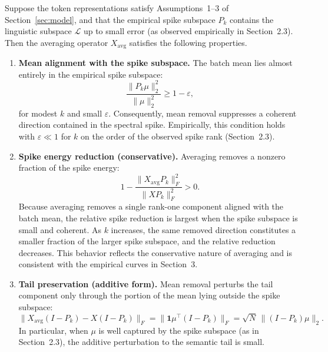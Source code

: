 \begin{theorem}
\label{thm:avg_spectral}
Suppose the token representations satisfy Assumptions~1–3 of
Section~\ref{sec:model}, and that the empirical spike subspace $P_k$ contains the
linguistic subspace $\mathcal L$ up to small error (as observed empirically in
Section~2.3).
Then the averaging operator $X_{\mathrm{avg}}$ satisfies the following properties.

\begin{enumerate}

\item \textbf{Mean alignment with the spike subspace.}
The batch mean lies almost entirely in the empirical spike subspace:
\begin{equation}
\label{eq:mean_spike_align}
\frac{\|P_k \mu\|_2^2}{\|\mu\|_2^2} \ge 1 - \varepsilon,
\end{equation}
for modest $k$ and small $\varepsilon$.
Consequently, mean removal suppresses a coherent direction contained in the
spectral spike.
Empirically, this condition holds with $\varepsilon \ll 1$ for $k$ on the order
of the observed spike rank (Section~2.3).

\item \textbf{Spike energy reduction (conservative).}
Averaging removes a nonzero fraction of the spike energy:
\begin{equation}
\label{eq:spike_reduction}
1 - \frac{\|X_{\mathrm{avg}} P_k\|_F^2}{\|X P_k\|_F^2} > 0.
\end{equation}
Because averaging removes a single rank-one component aligned with the batch
mean, the relative spike reduction is largest when the spike subspace is small
and coherent.
As $k$ increases, the same removed direction constitutes a smaller fraction of
the larger spike subspace, and the relative reduction decreases.
This behavior reflects the conservative nature of averaging and is consistent
with the empirical curves in Section~3.

\item \textbf{Tail preservation (additive form).}
Mean removal perturbs the tail component only through the portion of the mean
lying outside the spike subspace:
\begin{equation}
\label{eq:tail_additive_main}
\|X_{\mathrm{avg}}(I-P_k) - X(I-P_k)\|_F
=
\|\mathbf{1}\mu^\top(I-P_k)\|_F
=
\sqrt{N}\,\|(I-P_k)\mu\|_2.
\end{equation}
In particular, when $\mu$ is well captured by the spike subspace (as in
Section~2.3), the additive perturbation to the semantic tail is small.


\end{enumerate}
\end{theorem}
